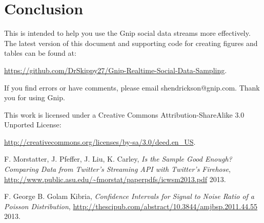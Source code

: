 \documentclass{article}
\begin{document}

\section{Conclusion} 

This is intended to help you use the Gnip social data streams more effectively.  The latest version of this
document and supporting code for creating figures and tables can be found at:

\noindent \url{https://github.com/DrSkippy27/Gnip-Realtime-Social-Data-Sampling}.

If you find errors
or have comments, please email shendrickson@gnip.com. Thank you for using Gnip.

This work is licensed under a Creative Commons Attribution-ShareAlike 3.0 Unported License:

\noindent \url{http://creativecommons.org/licenses/by-sa/3.0/deed.en_US}.


\begin{thebibliography}{2013}



 F. Morstatter, J. Pfeffer, J. Liu, K. Carley, \textsl{Is the Sample Good Enough? Comparing Data from Twitter’s Streaming API with Twitter’s Firehose}, \url{http://www.public.asu.edu/~fmorstat/paperpdfs/icwsm2013.pdf} 2013.

 F. George B. Golam Kibria, \textsl{Confidence Intervals for Signal to Noise Ratio of
a Poisson Distribution}, \url{http://thescipub.com/abstract/10.3844/amjbsp.2011.44.55} 2013.

\end{thebibliography}
\end{document}
